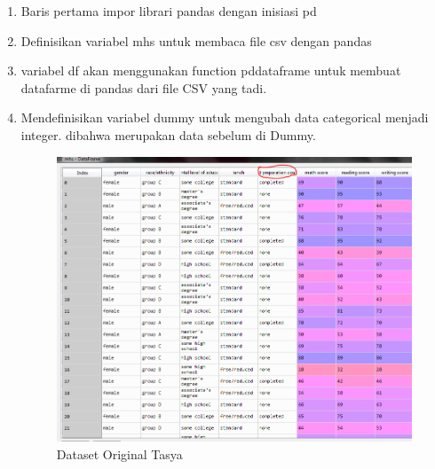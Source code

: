 \begin{enumerate}
\item Baris pertama impor librari pandas dengan inisiasi pd
\item Definisikan variabel mhs untuk membaca file csv dengan pandas
\item variabel df akan menggunakan function pddataframe untuk membuat datafarme di pandas dari file CSV yang tadi.
\item Mendefinisikan variabel dummy untuk mengubah data categorical menjadi integer. dibahwa merupakan data sebelum di Dummy. 
\begin{figure}[ht]
\centering
\includegraphics[scale=0.5]{figures/praktektasya2.png}
\caption{Dataset Original Tasya}
\label{Aplikasi Pandas}
\end{figure}


\end{enumerate}
